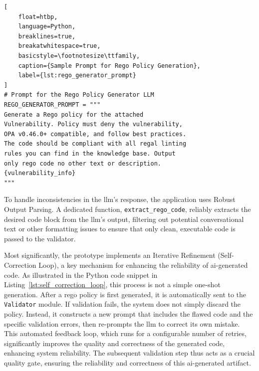 \begin{lstlisting}[
    float=htbp,
    language=Python, 
    breaklines=true, 
    breakatwhitespace=true,
    basicstyle=\footnotesize\ttfamily,
    caption={Sample Prompt for Rego Policy Generation},
    label={lst:rego_generator_prompt}
]
# Prompt for the Rego Policy Generator LLM
REGO_GENERATOR_PROMPT = """
Generate a Rego policy for the attached 
Vulnerability. Policy must deny the vulnerability, 
OPA v0.46.0+ compatible, and follow best practices. 
The code should be compliant with all regal linting 
rules you can find in the knowledge base. Output 
only rego code no other text or description.
{vulnerability_info}
"""
\end{lstlisting}

To handle inconsistencies in the \gls{llm}'s response, the application uses Robust Output Parsing. A dedicated function, \texttt{extract\_rego\_code}, reliably extracts the desired code block from the \gls{llm}'s output, filtering out potential conversational text or other formatting issues to ensure that only clean, executable code is passed to the validator.

Most significantly, the prototype implements an Iterative Refinement (Self-Correction Loop), a key mechanism for enhancing the reliability of \gls{ai}-generated code. As illustrated in the Python code snippet in Listing~\ref{lst:self_correction_loop}, this process is not a simple one-shot generation. After a \gls{rego} policy is first generated, it is automatically sent to the \texttt{Validator} module. If validation fails, the system does not simply discard the policy. Instead, it constructs a new prompt that includes the flawed code and the specific validation errors, then re-prompts the \gls{llm} to correct its own mistake. This automated feedback loop, which runs for a configurable number of retries, significantly improves the quality and correctness of the generated code, enhancing system reliability. The subsequent validation step thus acts as a crucial quality gate, ensuring the reliability and correctness of this \gls{ai}-generated artifact.

